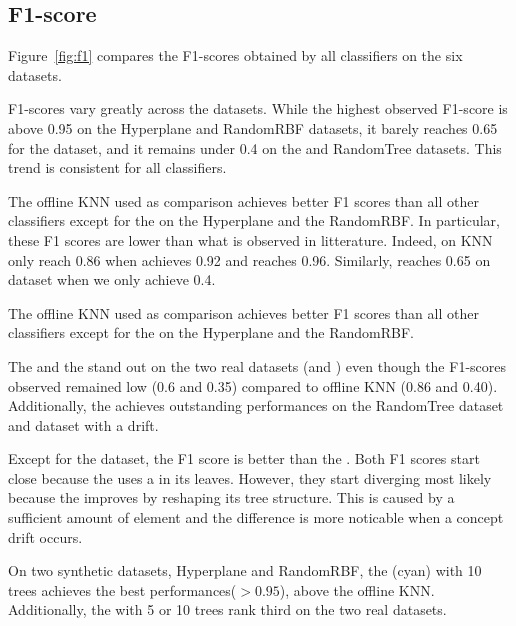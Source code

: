 \subsection{F1-score}
Figure~\ref{fig:f1} compares the F1-scores obtained by all classifiers on the
six datasets.

F1-scores vary greatly across the datasets. While the highest
observed F1-score is above 0.95 on the Hyperplane and RandomRBF datasets,
it barely reaches 0.65 for the \banosdataset dataset, and it remains under
0.4 on the \recofitdataset and RandomTree datasets. This trend is
consistent for all classifiers.

The offline KNN used as comparison achieves better F1 scores than all other
classifiers except for the \mondrianforest on the Hyperplane and the RandomRBF.
In particular, these F1 scores are lower than what is observed in litterature.
Indeed, on \banosdataset KNN only reach 0.86 when \cite{behzad2019} achieves
0.92 and \cite{Banos_2014} reaches 0.96. Similarly, \cite{behzad2019} reaches
0.65 on \recofitdataset dataset when we only achieve 0.4.

The offline KNN used as comparison achieves better F1 scores than all other
classifiers except for the \mondrianforest on the Hyperplane and the RandomRBF.

The \naivebayes and the \hoeffdingtree stand out on the two real datasets
(\banosdataset and \recofitdataset) even though the F1-scores observed remained
low (0.6 and 0.35) compared to offline KNN (0.86 and 0.40). Additionally, the
\hoeffdingtree achieves outstanding performances on the RandomTree dataset and
\banosdataset dataset with a drift.

Except for the \banosdataset dataset, the \hoeffdingtree F1 score is better than
the \naivebayes. Both F1 scores start close because the \hoeffdingtree uses a
\naivebayes in its leaves.  However, they start diverging most likely because
the \hoeffdingtree improves by reshaping its tree structure.  This is caused by
a sufficient amount of element and the difference is more noticable when a
concept drift occurs.

On two synthetic datasets, Hyperplane and RandomRBF, the \mondrianforest (cyan)
with 10 trees achieves the best performances($> 0.95$), above the offline KNN.
Additionally, the \mondrianforest with 5 or 10 trees rank third on the two real
datasets.

